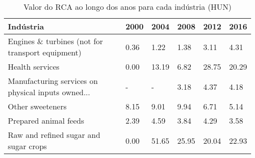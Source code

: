 \begin{table}
\centering
\caption{Valor do RCA ao longo dos anos para cada indústria (HUN)}
\begin{tabular}{p{6cm}p{1.5cm}p{1.5cm}p{1.5cm}p{1.5cm}p{1.5cm}}
\toprule
                                         Indústria & 2000 &  2004 &  2008 &  2012 &  2016 \\
\midrule
  Engines \& turbines (not for transport equipment) & 0.36 &  1.22 &  1.38 &  3.11 &  4.31 \\
                                   Health services & 0.00 & 13.19 &  6.82 & 28.75 & 20.29 \\
Manufacturing services on physical inputs owned... &    - &     - &  3.18 &  4.37 &  4.18 \\
                                  Other sweeteners & 8.15 &  9.01 &  9.94 &  6.71 &  5.14 \\
                             Prepared animal feeds & 2.39 &  4.59 &  3.84 &  4.29 &  3.58 \\
             Raw and refined sugar and sugar crops & 0.00 & 51.65 & 25.95 & 20.04 & 22.93 \\
\bottomrule
\end{tabular}
\end{table}
